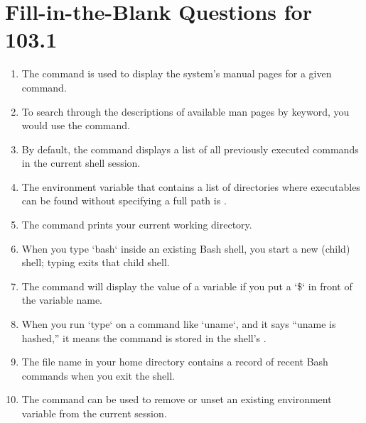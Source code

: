 \documentclass[a4paper]{report}
\begin{document}
\section*{Fill-in-the-Blank Questions for 103.1}

\begin{enumerate}[1.]
\item The command \underline{\hspace{2cm}} is used to display the system’s manual pages for a given command.

\item To search through the descriptions of available man pages by keyword, you would use the \underline{\hspace{2cm}} command.

\item By default, the \underline{\hspace{2cm}} command displays a list of all previously executed commands in the current shell session.

\item The environment variable that contains a list of directories where executables can be found without specifying a full path is \underline{\hspace{2cm}}.

\item The command \underline{\hspace{2cm}} prints your current working directory.

\item When you type `bash` inside an existing Bash shell, you start a new (child) shell; typing \underline{\hspace{2cm}} exits that child shell.

\item The \underline{\hspace{2cm}} command will display the value of a variable if you put a `\$` in front of the variable name.

\item When you run `type` on a command like `uname`, and it says “uname is hashed,” it means the command is stored in the shell’s \underline{\hspace{2cm}}.

\item The file name \underline{\hspace{2cm}} in your home directory contains a record of recent Bash commands when you exit the shell.

\item The command \underline{\hspace{2cm}} can be used to remove or unset an existing environment variable from the current session.
\end{enumerate}
\end{document}
